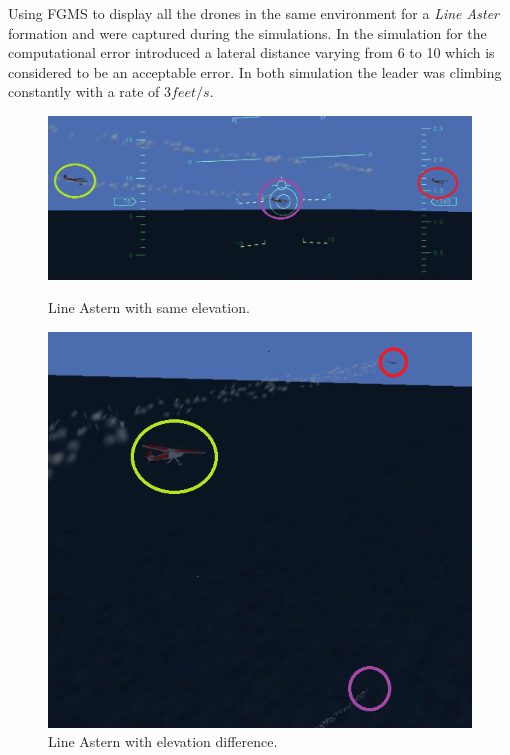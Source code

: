 
Using FGMS to display all the drones in the same environment for a \textit{Line
  Aster} formation   and 
were captured during the simulations. In the simulation for 
the computational error introduced a lateral distance varying from 6 to 10 which
is considered to be an acceptable error. In both simulation the leader was
climbing constantly with a rate of $3feet/s$.

\begin{figure}[p]
\centering
\includegraphics[scale=0.5]{src/img/line2.png}
\label{img:line2}
\caption{Line Astern with same elevation.}
\includegraphics[scale=0.8]{src/img/line1.png}
\caption{Line Astern with elevation difference.}
\label{img:line1}
\end{figure}
\newpage

